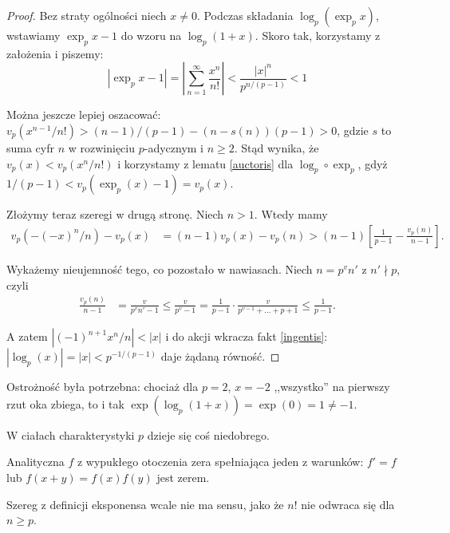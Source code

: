 \begin{proof}
	Bez straty ogólności niech $x \neq 0$.
	Podczas składania $\log_p(\exp_p x)$, wstawiamy $\exp_p x - 1$ do wzoru na $\log_p (1 + x)$.
	Skoro tak, korzystamy z założenia i piszemy:
	\[
		|\exp_p x - 1| = \left|\sum_{n=1}^\infty \frac {x^n}{n!} \right| < \frac{|x|^n}{p^{n / (p-1)}} < 1
	\]

	Można jeszcze lepiej oszacować: $v_p(x^{n-1} / n!) > (n-1)/(p-1) - (n-s(n))(p-1) > 0$, gdzie $s$ to suma cyfr $n$ w rozwinięciu $p$-adycznym i $n \ge 2$.
	Stąd wynika, że $v_p(x) < v_p(x^n / n!)$ i korzystamy z lematu \ref{auctoris} dla $\log_p \circ \exp_p$, gdyż $1/(p-1) < v_p(\exp_p(x) - 1) = v_p(x)$. %

	Złożymy teraz szeregi w drugą stronę.
	Niech $n > 1$. 
	Wtedy mamy
	\begin{align*}
		v_p(-(-x)^n/n) - v_p(x) & = (n-1) v_p(x) - v_p(n) > (n-1) \left[ \frac{1}{p-1} - \frac{v_p(n)}{n-1}\right].
	\end{align*}

	Wykażemy nieujemność tego, co pozostało w nawiasach.
	Niech $n = p^v n'$ z $n ' \nmid p$, czyli
	\begin{align*}
		\frac{v_p(n)}{n-1} & = \frac{v}{p^v n' -1 } \le \frac{v}{p^v - 1}  = \frac{1}{p-1} \cdot \frac{v}{p^{v-1} + \ldots + p + 1} \le \frac{1}{p-1}.
	\end{align*}

	A zatem $|(-1)^{n+1} x^n/n| < |x|$ i do akcji wkracza fakt \ref{ingentis}: $|\log_p(x)| = |x| < p^{-1/(p-1)}$ daje żądaną równość.
\end{proof}

Ostrożność była potrzebna: chociaż dla $p = 2$, $x = -2$ ,,wszystko'' na pierwszy rzut oka zbiega, to i tak $\exp(\log_p(1+x)) = \exp(0) = 1 \neq -1$.

W ciałach charakterystyki $p$ dzieje się coś niedobrego.
\begin{fakt}
	Analityczna  $f$ z wypukłego otoczenia zera spełniająca jeden z warunków: $f' = f$ lub $f(x+y) = f(x)f(y)$ jest zerem.
\end{fakt}

Szereg z definicji eksponensa wcale nie ma sensu, jako że $n!$ nie odwraca się dla $n \ge p$.